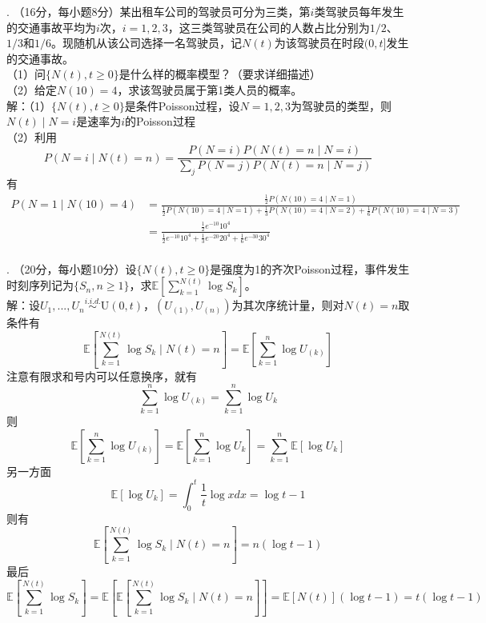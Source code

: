 \documentclass[UTF8]{ctexart}
\begin{document}
	
	
	
. （16分，每小题8分）某出租车公司的驾驶员可分为三类，第$i$类驾驶员每年发生的交通事故平均为$i$次，$i=1,2,3$，这三类驾驶员在公司的人数占比分别为$1/2$、$1/3$和$1/6$。现随机从该公司选择一名驾驶员，记$N(t)$为该驾驶员在时段$(0,t]$发生的交通事故。\\
（1）问$\{N(t), t \geq 0\}$是什么样的概率模型？（要求详细描述）\\
（2）给定$N(10)=4$，求该驾驶员属于第1类人员的概率。\\
解：（1）$\{N(t), t \geq 0\}$是条件Poisson过程，设$N=1,2,3$为驾驶员的类型，则$N(t)\mid N=i$是速率为$i$的Poisson过程\\
（2）利用
\[
P(N=i \mid N(t)=n)=\frac{P(N=i)P(N(t)=n\mid N=i)}{\sum\limits_{j}P(N=j)P(N(t)=n\mid N=j)}
\]
有
\begin{align*}
	P(N=1 \mid N(10)=4) &= \frac{\frac{1}{2}P(N(10)=4\mid N=1)}{\frac{1}{2}P(N(10)=4\mid N=1)+\frac{1}{3}P(N(10)=4\mid N=2)+\frac{1}{6}P(N(10)=4\mid N=3)} \\
	& = \frac{\frac{1}{2}e^{-10} 10^4}{\frac{1}{2}e^{-10} 10^4+\frac{1}{3}e^{-20} 20^4+\frac{1}{6}e^{-30} 30^4}
\end{align*}\\



	
	
	
	
. （20分，每小题10分）设$\{N(t), t \geq 0\}$是强度为1的齐次Poisson过程，事件发生时刻序列记为$\{S_n, n \geq 1\}$，求$\mathbb{E}\left[\sum\limits_{k=1}^{N(t)} \log S_k \right]$。\\
解：设$U_1,...,U_n\stackrel{i.i.d.}{\sim }\mathrm{U}(0,t)$，$(U_{(1)},U_{(n)})$为其次序统计量，则对$N(t)=n$取条件有
\[
\mathbb{E}\left[\sum\limits_{k=1}^{N(t)} \log S_k \mid N(t)=n \right]=\mathbb{E}\left[\sum\limits_{k=1}^{n} \log U_{(k)} \right]
\]
注意有限求和号内可以任意换序，就有
\[
\sum\limits_{k=1}^{n} \log U_{(k)}=\sum\limits_{k=1}^{n} \log U_{k} 
\]
则
\[
\mathbb{E}\left[\sum\limits_{k=1}^{n} \log U_{(k)} \right]=\mathbb{E}\left[\sum\limits_{k=1}^{n} \log U_{k} \right]=\sum\limits_{k=1}^{n}\mathbb{E}\left[\log U_{k} \right]
\]
另一方面
\[
\mathbb{E}\left[\log U_{k} \right]=\int_{0}^{t} \frac{1}{t} \log x dx=\log t -1
\]
则有
\[
\mathbb{E}\left[\sum\limits_{k=1}^{N(t)} \log S_k \mid N(t)=n \right]=n(\log t - 1)
\]
最后
\[
\mathbb{E}\left[\sum\limits_{k=1}^{N(t)} \log S_k  \right]=\mathbb{E}\left[\mathbb{E}\left[\sum\limits_{k=1}^{N(t)} \log S_k \mid N(t)=n \right] \right] =\mathbb{E}[N(t)](\log t - 1)=t(\log t - 1)
\]\\














	
\end{document}
